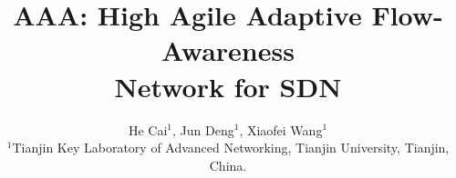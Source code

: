 \documentclass[conference,compsoc]{IEEEtran}
\begin{document}
%
\title{AAA: High Agile Adaptive Flow-Awareness \\ Network for SDN}


\author{He Cai$^{1}$, Jun Deng$^{1}$, Xiaofei Wang$^{1}$
\\
${^1}$Tianjin Key Laboratory of Advanced Networking, %
Tianjin University, Tianjin, China.
}



% 
\end{document}
